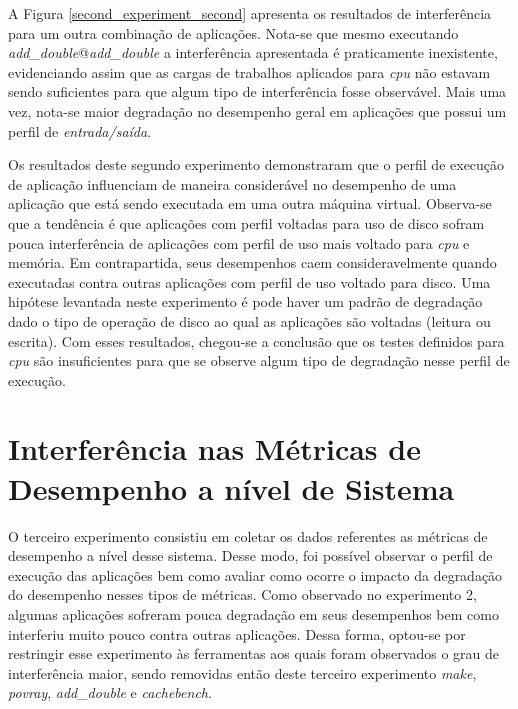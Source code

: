 A Figura \ref{second_experiment_second} apresenta os resultados de interferência para um outra combinação de aplicações. Nota-se que mesmo executando \textit{add\_double}@\textit{add\_double} a interferência apresentada é praticamente inexistente, evidenciando assim que as cargas de trabalhos aplicados para \textit{cpu} não estavam sendo suficientes para que algum tipo de interferência fosse observável. Mais uma vez, nota-se maior degradação no desempenho geral em aplicações que possui um perfil de \textit{entrada/saída}.

Os resultados deste segundo experimento demonstraram que o perfil de execução de aplicação influenciam de maneira considerável no desempenho de uma aplicação que está sendo executada em uma outra máquina virtual. Observa-se que a tendência é que aplicações com perfil voltadas para uso de disco sofram pouca interferência de aplicações com perfil de uso mais voltado para \textit{cpu} e memória. Em contrapartida, seus desempenhos caem consideravelmente quando executadas contra outras aplicações com perfil de uso voltado para disco. Uma hipótese levantada neste experimento é pode haver um padrão de degradação dado o tipo de operação de disco ao qual as aplicações são voltadas (leitura ou escrita). Com esses resultados, chegou-se a conclusão que os testes definidos para \textit{cpu} são insuficientes para que se observe algum tipo de degradação nesse perfil de execução. 

\section{Interferência nas Métricas de Desempenho a nível de Sistema}
O terceiro experimento consistiu em coletar os dados referentes as métricas de desempenho a nível desse sistema. Desse modo, foi possível observar o perfil de execução das aplicações bem como avaliar como ocorre o impacto da degradação do desempenho nesses tipos de métricas. Como observado no experimento 2, algumas aplicações sofreram pouca degradação em seus desempenhos bem como interferiu muito pouco contra outras aplicações. Dessa forma, optou-se por restringir esse experimento às ferramentas aos quais foram observados o grau de interferência maior, sendo removidas então deste terceiro experimento \textit{make}, \textit{povray}, \textit{add\_double} e \textit{cachebench}.

